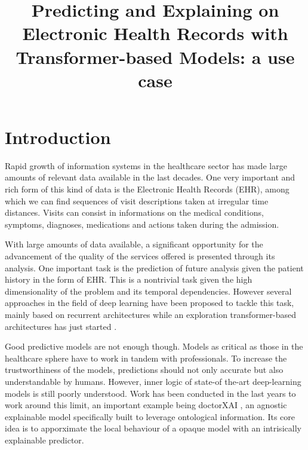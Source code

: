 \documentclass[]{marticle}
\title{\textbf{\huge Predicting and Explaining on Electronic Health Records  with Transformer-based Models: a use case}}
\date{}
\begin{document}
\maketitle
\newpage

\section{Introduction}

Rapid growth of information systems in the healthcare sector has made large amounts of relevant data
available in the last decades. One very important and rich form of this kind of data is the
Electronic Health Records (EHR), among which we can find sequences of visit descriptions taken at
irregular time distances. Visits can consist in informations on the medical conditions, symptoms,
diagnoses, medications and actions taken during the admission. 

With large amounts of data available, a significant opportunity for the advancement of the quality of
the services offered is presented through its analysis. One important task is the prediction of
future analysis given the patient history in the form of EHR. This is a nontrivial task given the
high dimensionality of the problem and its temporal dependencies. However several approaches in the
field of deep learning have been proposed to tackle this task, mainly based on recurrent
architectures  while an exploration transformer-based architectures has just started
.

Good predictive models are not enough though. Models as critical as those in the healthcare sphere
have to work in tandem with professionals. To increase the trustworthiness of the models,
predictions should not only accurate but also understandable by humans. However, inner logic of
state-of the-art deep-learning models is still poorly understood. Work has been conducted in the
last years to work around this limit, an important example being doctorXAI \cite{panigutti-xai}, an
agnostic explainable model specifically built to leverage ontological information. Its core idea is
to apporximate the local behaviour of a opaque model with an intrisically explainable predictor.
\end{document}
